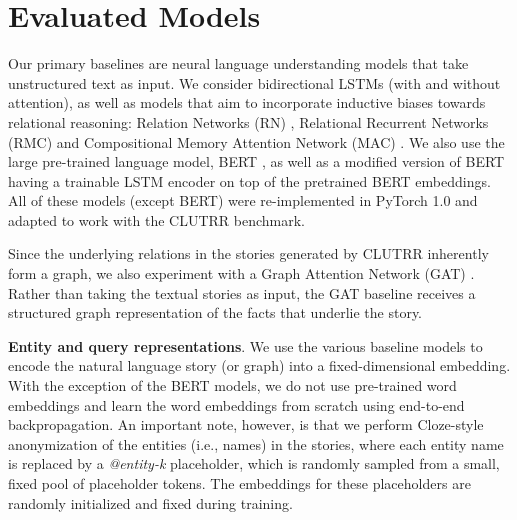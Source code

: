 \documentclass[letterpaper, 12pt]{report}
\newcommand{\xhdr}[1]{{\noindent\bfseries #1}.}
\begin{document}







\section{Evaluated Models}
\label{sec:clutrr_models}

Our primary baselines are neural language understanding models that take unstructured text as input.
We consider bidirectional LSTMs \citep{hochreiter1997long, cho2014learning} (with and without attention), as well as models that aim to incorporate inductive biases towards relational reasoning: Relation Networks (RN) \citep{santoro2017simple}, Relational Recurrent Networks (RMC) \citep{santoro2018relational} and Compositional Memory Attention Network (MAC) \citep{hudson2018compositional}. We also use the large pre-trained language model, BERT \citep{devlin2018bert}, as well as a modified version of BERT having a trainable LSTM encoder on top of the pretrained BERT embeddings.
All of these models (except BERT) were re-implemented in PyTorch 1.0 \citep{paszke2017automatic} and adapted to work with the CLUTRR benchmark.

Since the underlying relations in the stories generated by CLUTRR inherently form a graph, we also experiment with a Graph Attention Network (GAT) \citep{Velickovic2017-mh}.
Rather than taking the textual stories as input, the GAT baseline receives a structured graph representation of the facts that underlie the story.


\xhdr{Entity and query representations}
We use the various baseline models to encode the natural language story (or graph) into a fixed-dimensional embedding.
With the exception of the BERT models, we do not use pre-trained word embeddings and learn the word embeddings from scratch using end-to-end backpropagation.
An important note, however, is that we perform Cloze-style anonymization \citep{hermann2015teaching} of the entities (i.e., names) in the stories, where each entity name is replaced by a \textit{@entity-k} placeholder, which is randomly sampled from a small, fixed pool of placeholder tokens. The embeddings for these placeholders are randomly initialized and fixed during training.
\end{document}
